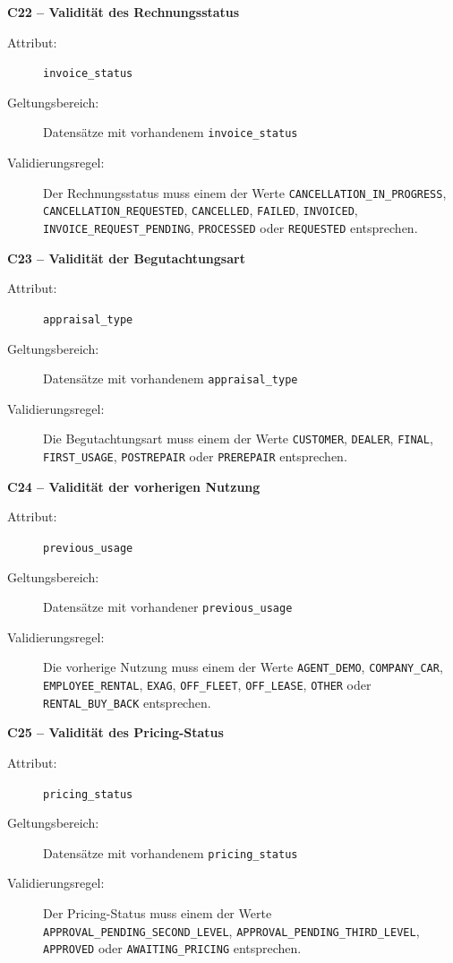 \documentclass[../main.tex]{subfiles}
\begin{document}
\medskip 
\noindent\textbf{C22 -- Validität des Rechnungsstatus} 
\begin{description} 
    \item[Attribut:] \texttt{invoice\_status} 
    \item[Geltungsbereich:] Datensätze mit vorhandenem \texttt{invoice\_status} 
    \item[Validierungsregel:] Der Rechnungsstatus muss einem der Werte \texttt{CANCELLATION\_IN\_PROGRESS}, \texttt{CANCELLATION\_REQUESTED}, \texttt{CANCELLED}, \texttt{FAILED}, \texttt{INVOICED}, \texttt{INVOICE\_REQUEST\_PENDING}, \texttt{PROCESSED} oder \texttt{REQUESTED} entsprechen. 
\end{description} 

\medskip 
\noindent\textbf{C23 -- Validität der Begutachtungsart} 
\begin{description} 
    \item[Attribut:] \texttt{appraisal\_type} 
    \item[Geltungsbereich:] Datensätze mit vorhandenem \texttt{appraisal\_type} 
    \item[Validierungsregel:] Die Begutachtungsart muss einem der Werte \texttt{CUSTOMER}, \texttt{DEALER}, \texttt{FINAL}, \texttt{FIRST\_USAGE}, \texttt{POSTREPAIR} oder \texttt{PREREPAIR} entsprechen. 
\end{description} 

\medskip 
\noindent\textbf{C24 -- Validität der vorherigen Nutzung} 
\begin{description} 
    \item[Attribut:] \texttt{previous\_usage} 
    \item[Geltungsbereich:] Datensätze mit vorhandener \texttt{previous\_usage} 
    \item[Validierungsregel:] Die vorherige Nutzung muss einem der Werte \texttt{AGENT\_DEMO}, \texttt{COMPANY\_CAR}, \texttt{EMPLOYEE\_RENTAL}, \texttt{EXAG}, \texttt{OFF\_FLEET}, \texttt{OFF\_LEASE}, \texttt{OTHER} oder \texttt{RENTAL\_BUY\_BACK} entsprechen. 
\end{description}

\medskip 
\noindent\textbf{C25 -- Validität des Pricing-Status} 
\begin{description} 
    \item[Attribut:] \texttt{pricing\_status} 
    \item[Geltungsbereich:] Datensätze mit vorhandenem \texttt{pricing\_status} 
    \item[Validierungsregel:] Der Pricing-Status muss einem der Werte \texttt{APPROVAL\_PENDING\_SECOND\_LEVEL}, \texttt{APPROVAL\_PENDING\_THIRD\_LEVEL}, \texttt{APPROVED} oder \texttt{AWAITING\_PRICING} entsprechen. 
\end{description}
\end{document}
